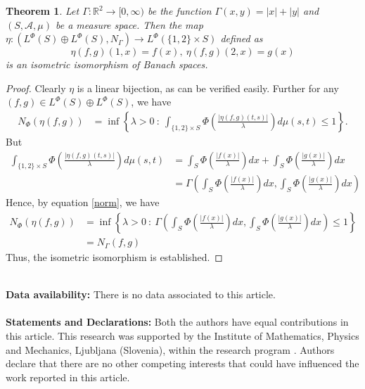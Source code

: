 \documentclass[pdflatex,sn-mathphys-num]{sn-jnl}%
\theoremstyle{thmstyleone}%
\newtheorem{theorem}{Theorem}%
\theoremstyle{thmstyletwo}%
\theoremstyle{thmstylethree}%
\begin{document}
\begin{theorem}
	Let $\Gamma:\mathbb R^2\to [0,\infty)$ be the function $\Gamma(x,y)=|x|+|y|$ and $(S,\mathcal A,\mu)$ be a measure space. Then the map $\eta:(L^\Phi(S)\oplus L^\Phi(S),N_\Gamma)\to L^\Phi(\{1,2\}\times S)$ defined as $$\eta(f,g)(1,x)=f(x),~\eta(f,g)(2,x)=g(x)$$ is an isometric isomorphism of Banach spaces.
\end{theorem}
\begin{proof}
	Clearly $\eta$ is a linear bijection, as can be verified easily. Further for any $(f,g)\in L^\Phi(S)\oplus L^\Phi(S)$, we have
	\begin{align}\label{norm}
		N_\Phi(\eta(f,g))&=\inf\left\{\lambda>0~:~ \int_{\{1,2\}\times S}\Phi\left(\frac{|\eta(f,g)(t,s)|}{\lambda}\right)d\mu(s,t)\leq 1\right\}.
	\end{align}
	But \begin{align*}
\int_{\{1,2\}\times S}\Phi\left(\frac{|\eta(f,g)(t,s)|}{\lambda}\right)d\mu(s,t)&=\int_{ S}\Phi\left(\frac{|f(x)|}{\lambda}\right)dx+\int_{ S}\Phi\left(\frac{|g(x)|}{\lambda}\right)dx\\&=\Gamma\left(\int_{ S}\Phi\left(\frac{|f(x)|}{\lambda}\right)dx, \int_{ S}\Phi\left(\frac{|g(x)|}{\lambda}\right)dx\right)
	\end{align*}
	Hence, by equation \ref{norm}, we have  
	\begin{align*}
			N_\Phi(\eta(f,g))&=\inf\left\{\lambda>0~:~ \Gamma\left(\int_{ S}\Phi\left(\frac{|f(x)|}{\lambda}\right)dx, \int_{ S}\Phi\left(\frac{|g(x)|}{\lambda}\right)dx\right)\leq 1\right\}\\&=N_\Gamma(f,g)
	\end{align*}
	Thus, the isometric isomorphism is established.
\end{proof}
~\\
{\bf Data availability:} There is no data associated to this article.\\
~\\{\bf Statements and Declarations:}
Both the authors have equal contributions in this article. This research was supported by the Institute of Mathematics, Physics and Mechanics, Ljubljana (Slovenia), within the research program . Authors declare that there are no other competing interests that could have influenced the work reported in this article.\\
\end{document}
